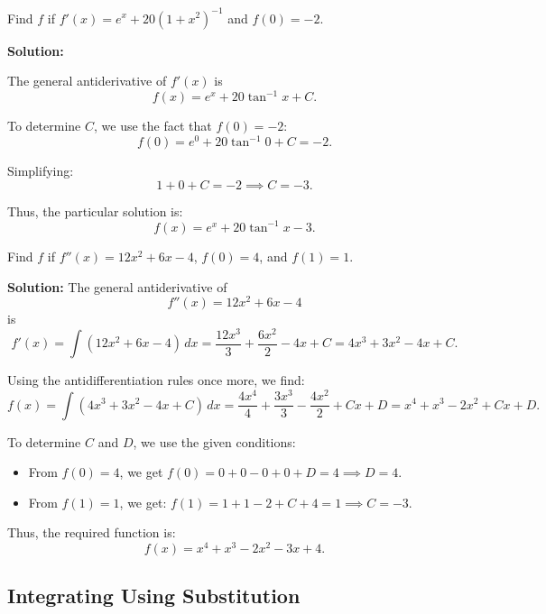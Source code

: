 \documentclass[12pt]{article}
\theoremstyle{beautifulthm}
\begin{document}
\begin{tcolorbox}[colback=examplebg, colframe=red!75!black, title=\textbf{EXAMPLE 2: Find the Integral of the Function}, fonttitle=\bfseries, sharp corners]
Find $f$ if $f'(x) = e^x + 20(1 + x^2)^{-1}$ and $f(0) = -2$.


\tcblower
\textbf{Solution:} 

The general antiderivative of $f'(x)$  
is 
\[
f(x) = e^x + 20 \tan^{-1} x + C.
\]

To determine $C$, we use the fact that $f(0) = -2$:
\[
f(0) = e^0 + 20 \tan^{-1} 0 + C = -2.
\]

Simplifying:
\[
1 + 0 + C = -2 \implies C = -3.
\]

Thus, the particular solution is:
\[
f(x) = e^x + 20 \tan^{-1} x - 3.
\]


\end{tcolorbox}


\begin{tcolorbox}[colback=examplebg, colframe=red!75!black, title=\textbf{EXAMPLE 3: Find the Integral of the Function}, fonttitle=\bfseries, sharp corners]

Find $f$ if $f''(x) = 12x^2 + 6x - 4$, $f(0) = 4$, and $f(1) = 1$.

\tcblower
\textbf{Solution:} 
The general antiderivative of 
\[
f''(x) = 12x^2 + 6x - 4
\]
is
\[
f'(x) = \int (12x^2 + 6x - 4) \, dx = \frac{12x^3}{3} + \frac{6x^2}{2} - 4x + C = 4x^3 + 3x^2 - 4x + C.
\]

Using the antidifferentiation rules once more, we find:
\[
f(x) = \int (4x^3 + 3x^2 - 4x + C) \, dx = \frac{4x^4}{4} + \frac{3x^3}{3} - \frac{4x^2}{2} + Cx + D = x^4 + x^3 - 2x^2 + Cx + D.
\]

To determine $C$ and $D$, we use the given conditions:
\begin{itemize}
    \item From $f(0) = 4$, we get $f(0) = 0 + 0 - 0 + 0 + D = 4 \implies D = 4$.
    \item From $f(1) = 1$, we get:  $f(1) = 1 + 1 - 2 + C + 4 = 1 \implies C = -3.$

\end{itemize}

Thus, the required function is:
\[
f(x) = x^4 + x^3 - 2x^2 - 3x + 4.
\]



\end{tcolorbox}


\newpage 
\subsection{Integrating Using Substitution}
\end{document}
